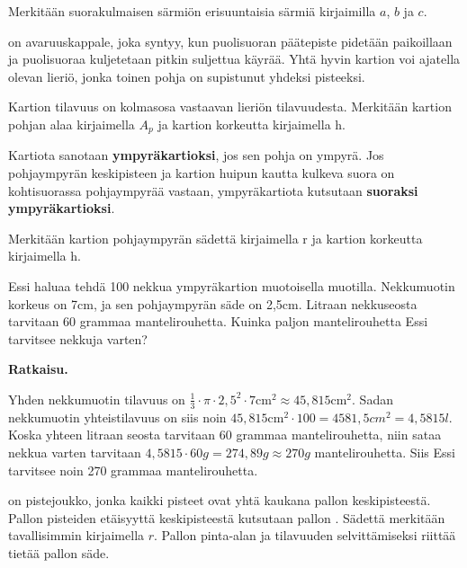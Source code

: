 Merkitään suorakulmaisen särmiön erisuuntaisia särmiä kirjaimilla $a$, $b$ ja $c$. 



 on avaruuskappale, joka syntyy, kun puolisuoran päätepiste pidetään paikoillaan ja puolisuoraa kuljetetaan pitkin suljettua käyrää. Yhtä hyvin kartion voi ajatella olevan lieriö, jonka toinen pohja on supistunut yhdeksi pisteeksi.

Kartion tilavuus on kolmasosa vastaavan lieriön tilavuudesta. Merkitään kartion pohjan alaa kirjaimella $A_p$ ja kartion korkeutta kirjaimella h.


Kartiota sanotaan \textbf{ympyräkartioksi}, jos sen pohja on ympyrä. Jos pohjaympyrän keskipisteen ja kartion huipun kautta kulkeva suora on kohtisuorassa pohjaympyrää vastaan, ympyräkartiota kutsutaan \textbf{suoraksi ympyräkartioksi}.

Merkitään kartion pohjaympyrän sädettä kirjaimella r ja kartion korkeutta kirjaimella h.



\begin{esimerkki}
Essi haluaa tehdä 100 nekkua ympyräkartion muotoisella muotilla. Nekkumuotin korkeus on 7cm, ja sen pohjaympyrän säde on 2,5cm. Litraan nekkuseosta tarvitaan 60 grammaa mantelirouhetta. Kuinka paljon mantelirouhetta Essi tarvitsee nekkuja varten?

\textbf{Ratkaisu.}

Yhden nekkumuotin tilavuus on $\frac{1}{3} \cdot \pi \cdot 2,5^2 \cdot 7 \text{cm}^2 \approx 45,815\text{cm}^2.$ Sadan nekkumuotin yhteistilavuus on siis noin $45,815\text{cm}^2 \cdot 100 = 4581,5 {cm}^2=4,5815 l$. Koska yhteen litraan seosta tarvitaan 60 grammaa mantelirouhetta, niin sataa nekkua varten tarvitaan $4,5815 \cdot 60 g = 274,89g \approx 270 g$ mantelirouhetta. Siis Essi tarvitsee noin 270 grammaa mantelirouhetta.

\end{esimerkki}

 on pistejoukko, jonka kaikki pisteet ovat yhtä kaukana pallon keskipisteestä. Pallon pisteiden etäisyyttä keskipisteestä kutsutaan pallon . Sädettä merkitään tavallisimmin kirjaimella $r$. Pallon pinta-alan ja tilavuuden selvittämiseksi riittää tietää pallon säde.


